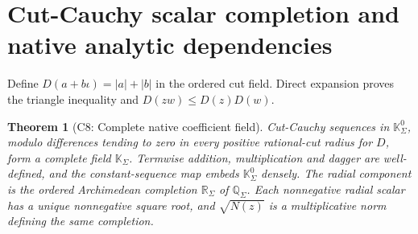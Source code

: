\documentclass[11pt]{article}
\newtheorem{theorem}{Theorem}[section]
\newcommand{\Qcut}{\mathbb Q_\Sigma}
\newcommand{\Rcut}{\mathbb R_\Sigma}
\newcommand{\Kcut}{\mathbb K_\Sigma}
\begin{document}
\section{Cut-Cauchy scalar completion and native analytic dependencies}
\label{sec:analytic}
Define $D(a+b\iota)=|a|+|b|$ in the ordered cut field. Direct expansion
proves the triangle inequality and $D(zw)\le D(z)D(w)$.

\begin{theorem}[C8: Complete native coefficient field]
\label{thm:completion}
Cut-Cauchy sequences in $\Kcut^0$, modulo differences tending to zero in
every positive rational-cut radius for $D$, form a complete field $\Kcut$.
Termwise addition, multiplication and dagger are well-defined, and the
constant-sequence map embeds $\Kcut^0$ densely. The radial component is
the ordered Archimedean completion $\Rcut$ of $\Qcut$. Each nonnegative
radial scalar has a unique nonnegative square root, and $\sqrt{N(z)}$
is a multiplicative norm defining the same completion.
\end{theorem}
\end{document}
